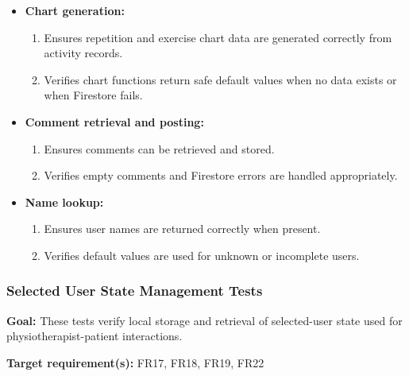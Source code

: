 \documentclass[12pt, titlepage]{article}
\begin{document}
\begin{itemize}
    \item \textbf{Chart generation:}
    \begin{enumerate}
        \item Ensures repetition and exercise chart data are generated correctly from activity records.
        \item Verifies chart functions return safe default values when no data exists or when Firestore fails.
    \end{enumerate}

    \item \textbf{Comment retrieval and posting:}
    \begin{enumerate}
        \item Ensures comments can be retrieved and stored.
        \item Verifies empty comments and Firestore errors are handled appropriately.
    \end{enumerate}

    \item \textbf{Name lookup:}
    \begin{enumerate}
        \item Ensures user names are returned correctly when present.
        \item Verifies default values are used for unknown or incomplete users.
    \end{enumerate}
\end{itemize}


\subsubsection{Selected User State Management Tests}

\textbf{Goal:} These tests verify local storage and retrieval of selected-user state used for physiotherapist-patient interactions.

\textbf{Target requirement(s):} FR17, FR18, FR19, FR22
\end{document}
